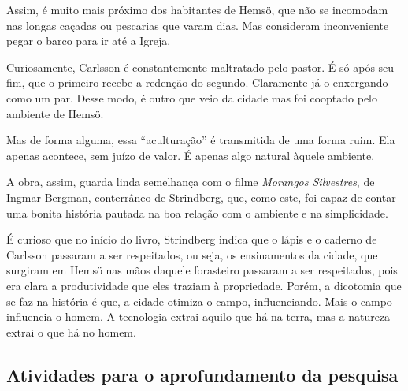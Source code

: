 \documentclass[12pt]{extarticle}
\begin{document}
Assim, é muito mais próximo dos habitantes de Hemsö, que não se
incomodam nas longas caçadas ou pescarias que varam dias. Mas consideram
inconveniente pegar o barco para ir até a Igreja.

Curiosamente, Carlsson é constantemente maltratado pelo pastor. É só
após seu fim, que o primeiro recebe a redenção do segundo. Claramente já
o enxergando como um par. Desse modo, é outro que veio da cidade mas foi
cooptado pelo ambiente de Hemsö.

Mas de forma alguma, essa ``aculturação'' é transmitida de uma forma
ruim. Ela apenas acontece, sem juízo de valor. É apenas algo natural
àquele ambiente.

A obra, assim, guarda linda semelhança com o filme 
\textit{Morangos Silvestres}, de Ingmar Bergman, conterrâneo de Strindberg, 
que, como este, foi capaz de contar uma bonita história pautada na boa 
relação com o ambiente e na simplicidade.




É curioso que no início do livro, Strindberg indica que o lápis e o
caderno de Carlsson passaram a ser respeitados, ou seja, os ensinamentos
da cidade, que surgiram em Hemsö nas mãos daquele forasteiro passaram a
ser respeitados, pois era clara a produtividade que eles traziam à
propriedade. Porém, a dicotomia que se faz na história é que, a cidade
otimiza o campo, influenciando. Mais o campo influencia o homem. A
tecnologia extrai aquilo que há na terra, mas a natureza extrai o que há
no homem.




\subsection{Atividades para o aprofundamento da pesquisa}


\end{document}

